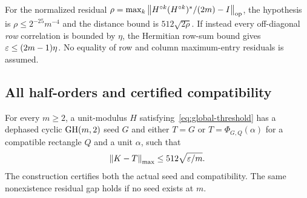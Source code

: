 For the normalized residual $\rho=\max_k\left\lVert H^{\circ k}(H^{\circ k})^*/(2m)-I\right\rVert_{\mathrm{op}}$, the hypothesis is $\rho\le2^{-25}m^{-4}$ and the distance bound is $512\sqrt{2\rho}$. If instead every off-diagonal \emph{row} correlation is bounded by $\eta$, the Hermitian row-sum bound gives $\varepsilon\le(2m-1)\eta$. No equality of row and column maximum-entry residuals is assumed.

\subsection{All half-orders and certified compatibility}
\begin{theorem}\label{thm:all}
For every $m\ge2$, a unit-modulus $H$ satisfying~\eqref{eq:global-threshold} has a dephased cyclic $\operatorname{GH}(m,2)$ seed $G$ and either $T=G$ or $T=\Phi_{G,Q}(\alpha)$ for a compatible rectangle $Q$ and a unit $\alpha$, such that
\[
 \left\lVert K-T\right\rVert_{\mathrm{max}}\le512\sqrt{\varepsilon/m}.
\]
The construction certifies both the actual seed and compatibility. The same nonexistence residual gap holds if no seed exists at $m$.
\end{theorem}
